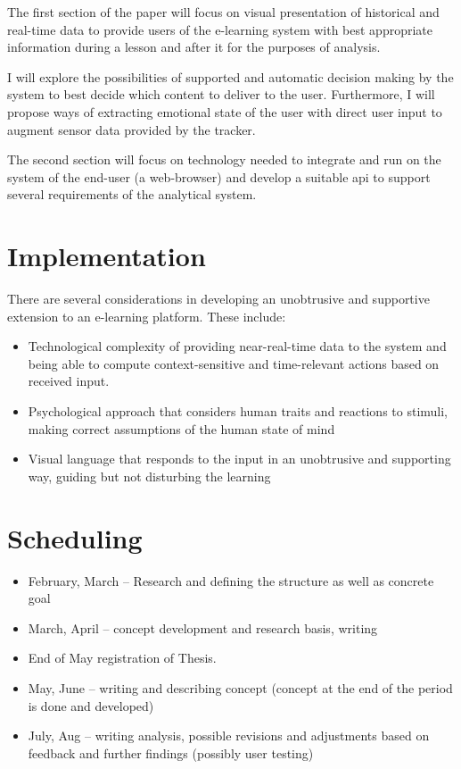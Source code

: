 The first section of the paper will focus on visual presentation of historical and real-time data to provide users of the e-learning system with best appropriate information during a lesson and after it for the purposes of analysis.

I will explore the possibilities of supported and automatic decision making by the system to best decide which content to deliver to the user. Furthermore, I will propose ways of extracting emotional state of the user with direct user input to augment sensor data provided by the tracker.

The second section will focus on technology needed to integrate and run on the system of the end-user (a web-browser) and develop a suitable api to support several requirements of the analytical system.

\section{Implementation}

There are several considerations in developing an unobtrusive and supportive extension to an e-learning platform. These include:

\begin{itemize}
	\item Technological complexity of providing near-real-time data to the system and being able to compute context-sensitive and time-relevant actions based on received input.
	\item Psychological approach that considers human traits and reactions to stimuli, making correct assumptions of the human state of mind
	\item Visual language that responds to the input in an unobtrusive and supporting way, guiding but not disturbing the learning  \cite{dix2003human,few2013information}
\end{itemize}



\section{Scheduling}
\begin{itemize}
	\item February, March – Research and defining the structure as well as concrete goal
	\item March, April – concept development and research basis, writing
	\item End of May registration of Thesis.
	\item May, June – writing and describing concept (concept at the end of the period is done and developed)
	\item July, Aug – writing analysis, possible revisions and adjustments based on feedback and further findings (possibly user testing)
\end{itemize}

